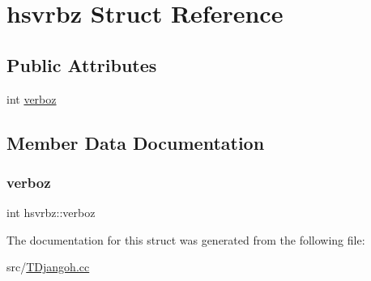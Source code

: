\hypertarget{structhsvrbz}{}\section{hsvrbz Struct Reference}
\label{structhsvrbz}
\subsection*{Public Attributes}
\begin{DoxyCompactItemize}
\item 
int \hyperlink{structhsvrbz_a02f7292df5d1dc9f1f6743e2e1fb9b8c}{verboz}
\end{DoxyCompactItemize}


\subsection{Member Data Documentation}
\mbox{\label{structhsvrbz_a02f7292df5d1dc9f1f6743e2e1fb9b8c}} 
\subsubsection{\texorpdfstring{verboz}{verboz}}
{\footnotesize\ttfamily int hsvrbz\+::verboz}



The documentation for this struct was generated from the following file\+:\begin{DoxyCompactItemize}
\item 
src/\hyperlink{_t_djangoh_8cc}{T\+Djangoh.\+cc}\end{DoxyCompactItemize}
